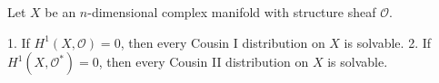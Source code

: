 Let $X$ be an $n$-dimensional complex manifold with structure sheaf $\mathcal{O}$.

1. If $H^1(X, \mathcal{O}) = 0$, then every Cousin I distribution on $X$ is solvable.
2. If $H^1(X, \mathcal{O}^*) = 0$, then every Cousin II distribution on $X$ is solvable.
